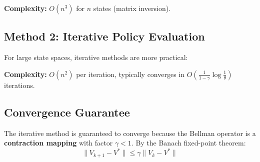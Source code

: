 \documentclass[11pt]{article}
\theoremstyle{definition}
\begin{document}
\textbf{Complexity:} $O(n^3)$ for $n$ states (matrix inversion).

\subsection{Method 2: Iterative Policy Evaluation}

For large state spaces, iterative methods are more practical:

\begin{center}
\end{center}

\textbf{Complexity:} $O(n^2)$ per iteration, typically converges in $O\left(\frac{1}{1-\gamma}\log\frac{1}{\theta}\right)$ iterations.

\subsection{Convergence Guarantee}

The iterative method is guaranteed to converge because the Bellman operator is a \textbf{contraction mapping} with factor $\gamma < 1$. By the Banach fixed-point theorem:
\[
\| V_{k+1} - V^* \| \leq \gamma \| V_k - V^* \|
\]
\end{document}
